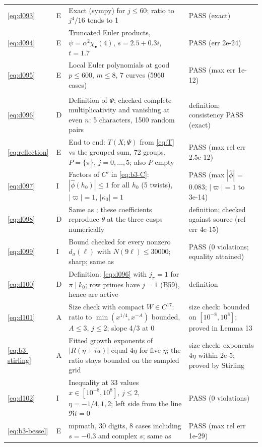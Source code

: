 \documentclass[11pt]{article}
\numberwithin{equation}{section}
\begin{document}
\begin{longtable}{@{}>{\raggedright\arraybackslash}p{1.2cm}>{\centering\arraybackslash}p{0.7cm}>{\raggedright\arraybackslash}p{9.05cm}>{\raggedright\arraybackslash}p{4.3cm}@{}}
\eqref{eq:d093} & E & Exact (sympy) for $j\le60$; ratio to $j^4/16$ tends to 1 & PASS (exact)\\
\eqref{eq:d094} & E & Truncated Euler products, $\psi=\alpha^2\chi_\bullet(4)$, $s=2.5+0.3i$, $t=1.7$ & PASS (err 2e-24)\\
\eqref{eq:d095} & E & Local Euler polynomials at good $p\le600$, $m\le8$, 7 curves (5960 cases) & PASS (max err 1e-12)\\
\multicolumn{4}{@{}l}{\emph{Appendix~A}}\\
\eqref{eq:d096} & D & Definition of $\Psi$; checked complete multiplicativity and vanishing at even $n$: 5 characters, 1500 random pairs & definition; consistency PASS (exact)\\
\eqref{eq:reflection} & E & End to end: $T(X;\Psi)$ from \eqref{eq:T} vs the grouped sum, 72 groups, $P=\{\pi\}$, $j=0,\dots,5$; also $P$ empty & PASS (max rel err 2.5e-12)\\
\eqref{eq:d097} & I & Factors of $C'$ in \eqref{eq:b3-C}: $|\hat\phi(h_0)|\le1$ for all $h_0$ (5 twists), $|\varpi|=1$, $|\kappa_0|=1$ & PASS (max $|\hat\phi|$ = 0.083; $|\varpi|=1$ to 3e-14)\\
\eqref{eq:d098} & D & Same as \cite[Theorem~23 (T3)]{QF}; these coefficients reproduce $\overline\theta$ at the three cusps numerically & definition; checked against source (rel err 4e-15)\\
\eqref{eq:d099} & I & Bound checked for every nonzero $d_\sigma(\ell)$ with $N(9\ell)\le30000$; sharp; same as \cite[Corollary~24]{QF} & PASS (0 violations; equality attained)\\
\eqref{eq:d100} & D & Definition: \eqref{eq:d096} with $j_\pi=1$ for $\pi\mid k_0$; row primes have $j=1$ (B59), hence are active & definition\\
\eqref{eq:d101} & A & Size check with compact $W\in C^{17}$: ratio to $\min(x^{1/4},x^{-A})$ bounded, $A\le3$, $j\le2$; slope 4/3 at 0 & size check: bounded on $[10^{-8},10^8]$; proved in Lemma 13\\
\eqref{eq:b3-stirling} & A & Fitted growth exponents of $|R(\eta+iu)|$ equal $4\eta$ for five $\eta$; the ratio stays bounded on the sampled grid & size check: exponents $4\eta$ within 2e-5; proved by Stirling\\
\eqref{eq:d102} & I & Inequality at 33 values $x\in[10^{-8},10^8]$, $j\le2$, $\eta=-1/4,1,2$; left side from the line $\Re t=0$ & PASS (0 violations)\\
\eqref{eq:b3-bessel} & E & mpmath, 30 digits, 8 cases including $s=-0.3$ and complex $s$; same as \cite[(5.21)]{QF} & PASS (max rel err 1e-29)\\

\end{longtable}
\end{document}
